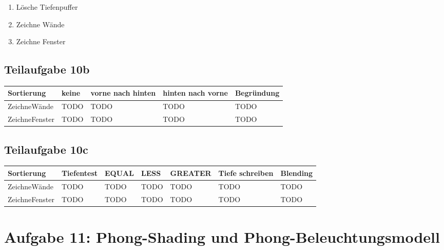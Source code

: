 \documentclass[a4paper]{scrartcl}
\begin{document}
\begin{enumerate}
    \item Lösche Tiefenpuffer
    \item Zeichne Wände
    \item Zeichne Fenster
\end{enumerate}

\subsection*{Teilaufgabe 10b}

\begin{table}[H]
    \begin{tabular}{lllll}
    \toprule
    Sortierung     & keine & vorne nach hinten & hinten nach vorne & Begründung \\\midrule
    ZeichneWände   & TODO  & TODO              & TODO              & TODO       \\
    ZeichneFenster & TODO  & TODO              & TODO              & TODO       \\\bottomrule
    \end{tabular}
\end{table}

\subsection*{Teilaufgabe 10c}
\begin{table}[H]
    \begin{tabular}{lllllll}\toprule
    Sortierung     & Tiefentest & EQUAL & LESS & GREATER & Tiefe schreiben & Blending \\\midrule
    ZeichneWände   & TODO       & TODO  & TODO & TODO    & TODO            & TODO    \\
    ZeichneFenster & TODO       & TODO  & TODO & TODO    & TODO            & TODO   \\\bottomrule
    \end{tabular}
\end{table}

\section*{Aufgabe 11: Phong-Shading und Phong-Beleuchtungsmodell}
\inputminted[linenos, numbersep=5pt, tabsize=4, frame=lines, label=shader.vert]{glsl}{shader.vert}
\end{document}
